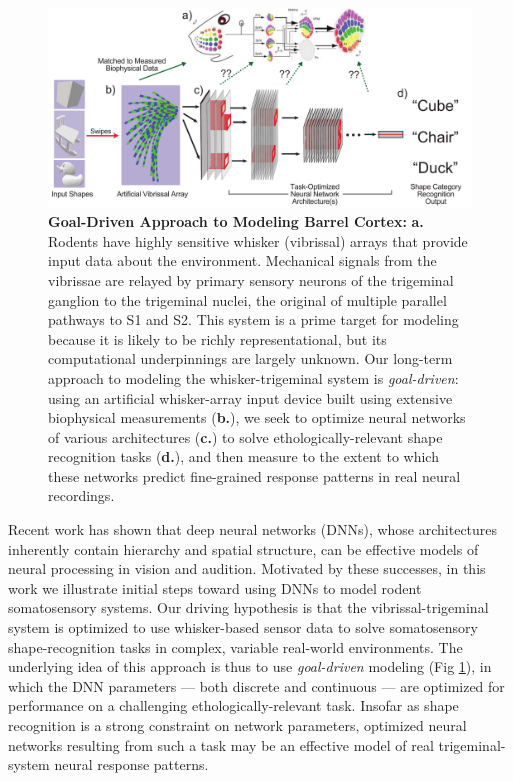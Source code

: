 \begin{figure}
\centering
\includegraphics[width=.85\linewidth]{figures/schematic.pdf}
\vspace{-3mm}
\caption{\footnotesize{\textbf{Goal-Driven Approach to Modeling Barrel Cortex:} \textbf{a.} Rodents have highly sensitive whisker (vibrissal) arrays that provide input data about the environment. Mechanical signals from the vibrissae are relayed by primary sensory neurons of the trigeminal ganglion to the trigeminal nuclei, the original of multiple parallel pathways to S1 and S2.  This system is a prime target for modeling because it is likely to be richly representational, but its computational underpinnings are largely unknown. Our long-term approach to modeling the whisker-trigeminal system is \emph{goal-driven}: using an artificial whisker-array input device built using extensive biophysical measurements (\textbf{b.}), we seek to optimize neural networks of various architectures (\textbf{c.}) to solve ethologically-relevant shape recognition tasks (\textbf{d.}), and then measure to the extent to which these networks predict fine-grained response patterns in real neural recordings.} ~\label{fig_schematic}}
\vspace{-5mm}
\end{figure}

Recent work has shown that deep neural networks (DNNs), whose architectures inherently contain hierarchy and spatial structure, can be effective models of neural processing in vision\cite{Yamins2014,khaligh2014deep} and audition\cite{kell_yamins_sfn}.
Motivated by these successes, in this work we illustrate initial steps toward using DNNs to model rodent somatosensory systems.
Our driving hypothesis is that the vibrissal-trigeminal system is optimized to use whisker-based sensor data to solve somatosensory shape-recognition tasks in complex, variable real-world environments.
The underlying idea of this approach is thus to use \emph{goal-driven} modeling (Fig \ref{fig_schematic}), in which the DNN parameters --- both discrete and continuous --- are optimized for performance on a challenging ethologically-relevant task\cite{yamins2016using}.
Insofar as shape recognition is a strong constraint on network parameters, optimized neural networks resulting from such a task may be an effective model of real trigeminal-system neural response patterns.

